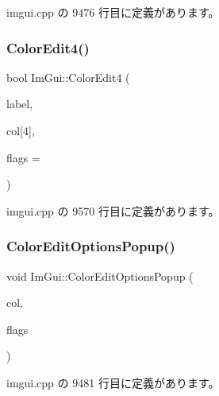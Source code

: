  imgui.\+cpp の 9476 行目に定義があります。

\mbox{\label{namespace_im_gui_ac3f45e2aa0b1d591cc8a2cdf8b566a45}} 
\subsubsection{\texorpdfstring{Color\+Edit4()}{ColorEdit4()}}
{\footnotesize\ttfamily bool Im\+Gui\+::\+Color\+Edit4 (\begin{DoxyParamCaption}\item[{const char $\ast$}]{label,  }\item[{float}]{col\mbox{[}4\mbox{]},  }\item[{\mbox{\hyperlink{imgui_8h_a6b2d5e95adc38f22c021252189f669c6}{Im\+Gui\+Color\+Edit\+Flags}}}]{flags = {} }\end{DoxyParamCaption})}



 imgui.\+cpp の 9570 行目に定義があります。

\mbox{\label{namespace_im_gui_a6bfb117816d669f8704e5d0c0c0795fe}} 
\subsubsection{\texorpdfstring{Color\+Edit\+Options\+Popup()}{ColorEditOptionsPopup()}}
{\footnotesize\ttfamily void Im\+Gui\+::\+Color\+Edit\+Options\+Popup (\begin{DoxyParamCaption}\item[{const float $\ast$}]{col,  }\item[{\mbox{\hyperlink{imgui_8h_a6b2d5e95adc38f22c021252189f669c6}{Im\+Gui\+Color\+Edit\+Flags}}}]{flags }\end{DoxyParamCaption})}



 imgui.\+cpp の 9481 行目に定義があります。

\mbox{\label{namespace_im_gui_a2a2a98cb9a17b18702be6b954670b388}} 
